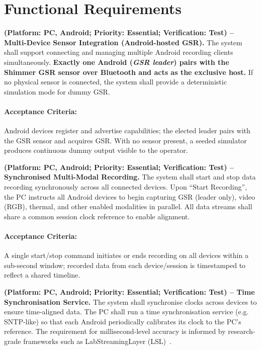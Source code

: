 \documentclass{report}
\begin{document}
    \section{Functional Requirements}
    \begin{description}[leftmargin=0cm]
        \item \textbf{(Platform: PC, Android; Priority: Essential; Verification: Test) – Multi-Device Sensor Integration (Android-hosted GSR).} The system shall support connecting and managing multiple Android recording clients simultaneously. \textbf{Exactly one Android (\emph{GSR leader}) pairs with the Shimmer GSR sensor over Bluetooth and acts as the exclusive host.} If no physical sensor is connected, the system shall provide a deterministic simulation mode for dummy GSR.
        \paragraph{Acceptance Criteria:} Android devices register and advertise capabilities; the elected leader pairs with the GSR sensor and acquires GSR. With no sensor present, a seeded simulator produces continuous dummy output visible to the operator.

        \item \textbf{(Platform: PC, Android; Priority: Essential; Verification: Test) – Synchronised Multi-Modal Recording.} The system shall start and stop data recording synchronously across all connected devices. Upon “Start Recording”, the PC instructs all Android devices to begin capturing GSR (leader only), video (RGB), thermal, and other enabled modalities in parallel. All data streams shall share a common session clock reference to enable alignment.
        \paragraph{Acceptance Criteria:} A single start/stop command initiates or ends recording on all devices within a sub-second window; recorded data from each device/session is timestamped to reflect a shared timeline.

        \item \textbf{(Platform: PC, Android; Priority: Essential; Verification: Test) – Time Synchronisation Service.} The system shall synchronise clocks across devices to ensure time-aligned data. The PC shall run a time synchronisation service (e.g. SNTP-like) so that each Android periodically calibrates its clock to the PC’s reference. The requirement for millisecond-level accuracy is informed by research-grade frameworks such as LabStreamingLayer (LSL)~\cite{kothe2014lsl}.

\end{description}
\end{document}
